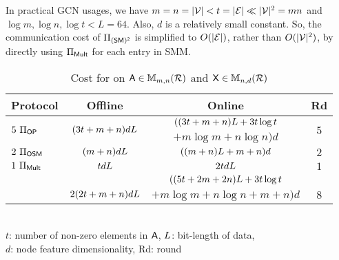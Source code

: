 In practical GCN usages, we have $m = n = |\mathcal{V}| < t = |\mathcal{E}| \ll |\mathcal{V}|^2 = mn$ and $\log m, \log n, \log t < L = 64$.
Also, $d$ is a relatively small constant.
So, the communication cost of $\prosmm$ is simplified to $O(|\mathcal{E}|)$, rather than $O(|\mathcal{V}|^2)$, by directly using $\Pi_{\mathsf{Mult}}$ for each entry in SMM.

\begin{table}[!t]
	\centering
	\caption{Cost for \osmm on $\mathsf{A} \in \mathbb{M}_{m,n}(\mathcal{R})$ and $\mathsf{X} \in \mathbb{M}_{n,d}(\mathcal{R})$}
	\setlength\extrarowheight{2pt}
	\setlength\tabcolsep{1pt}
	\begin{tabular}{l|c|c|c}
	\hline
	\textbf{Protocol} & \textbf{Offline} & \textbf{Online} & \textbf{Rd} \\
	\hline
	\multirow{2}{*}{$5\ {\Pi}_{\ssp}$} & \multirow{2}{*}{$(3t + m + n)dL$} & $((3t + m + n)L + 3t \log t$ & \multirow{2}{*}{$5$} \\
	& & $ + m \log m + n \log n)d$ & \\
	\hline
	$2\ \Pi_\SM$ & $(m + n)dL$ & $((m + n)L + m + n)d$ & $2$ \\
	\hline
	$1\ \promult$ & $tdL$ & $2tdL$ & $1$ \\
	\hline
	\rowcolor{grayL} & & $((5t + 2m + 2n)L + 3t\log t$ & \\
	\rowcolor{grayL}\multirow{-2}{*}{$\prosmm$} & \multirow{-2}{*}{$2(2t + m + n)dL$} & $ + m\log m + n\log n + m + n)d$ & \multirow{-2}{*}{$8$} \\\hline
	\end{tabular}\\
		$t$: number of non-zero elements in $\mathsf{A}$,
	$L$: bit-length of data,\\
	$d$: node feature dimensionality, Rd: round
	\label{table:SMM_comm}
\end{table}
